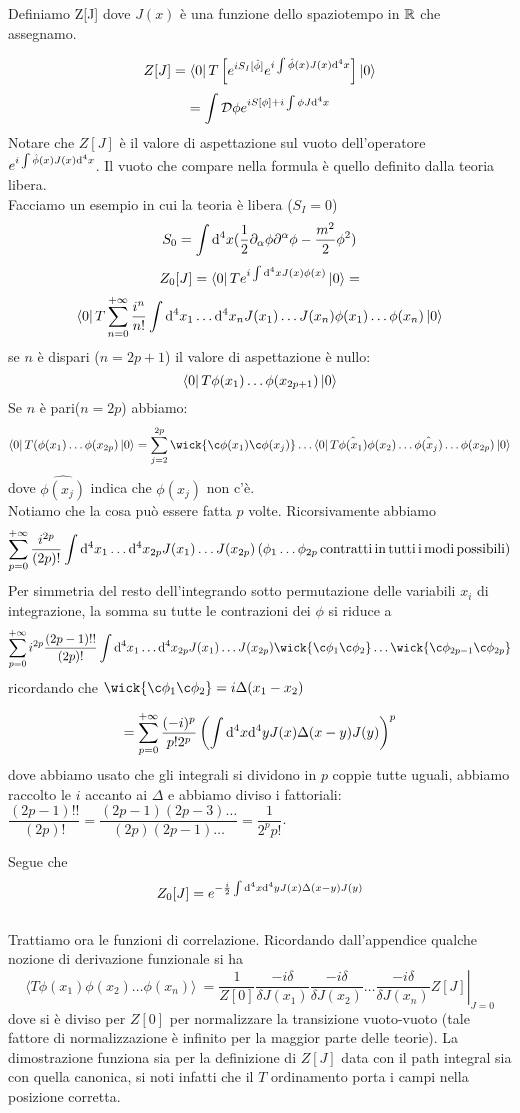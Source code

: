 \documentclass[a4paper, 11pt]{article}
\begin{document}
	
	Definiamo Z[J] dove $J(x)$ è una funzione dello spaziotempo in $\mathbb{R}$ che assegnamo.
	
	\[ Z[J] = \left\langle 0\right|T\left[e^{iS_I[\hat{\phi}]}e^{i\int{\hat{\phi}(x)J(x)}\mathrm{d}^4x}\right]\left| 0\right\rangle \]
	\[ = \int \mathcal{D}\phi e^{iS[\phi] + i \int \phi J \mathrm{d}^4 x} \]
	Notare che $Z[J]$ è il valore di aspettazione sul vuoto dell'operatore $e^{i\int{\hat{\phi}(x)J(x)}\mathrm{d}^4x}$. Il vuoto che compare nella formula è quello definito dalla teoria libera.
	\\
		
	Facciamo un esempio	in cui la teoria è libera ($S_I=0$)
	\[S_0 = \int \mathrm{d}^4 x (\frac{1}{2} \partial_\alpha \phi \partial^\alpha \phi - \frac{m^2}{2}\phi^2)\]
	\[Z_0[J]=\left\langle 0\right|Te^{i\int \mathrm{d}^4 x J(x)\phi(x)}\left| 0\right\rangle = \]
	\[\left\langle 0\right|T\sum_{n=0}^{+\infty} \frac{i^n}{n!}\int \mathrm{d}^4x_1 \dots \mathrm{d}^4 x_n J(x_1)\dots J(x_n) \phi(x_1)\dots \phi(x_n)\left| 0\right\rangle\]
	se $n$ è dispari ($n=2p+1$) il valore di aspettazione è nullo:
	\[\left\langle 0\right|T\phi(x_1)\dots \phi(x_{2p+1})\left| 0\right\rangle\]
	Se $n$ è pari($n=2p$) abbiamo:
	\[\bra{0}T(\phi(x_1)\dots\phi(x_{2p})\ket{0} = \sum_{j=2}^{2p}\wick{\c\phi(x_1) \c\phi(x_j)} \dots \bra{0}T\hat {\phi(x_1)} \phi(x_2) \dots \hat{\phi(x_j)}\dots \phi(x_{2p})\ket{0}\]
	dove $\hat {\phi(x_j)}$ indica che $\phi(x_j)$ non c'è.\\
	Notiamo che la cosa può essere fatta $p$ volte. Ricorsivamente abbiamo
	\[ \sum_{p=0}^{+\infty} \frac{i^{2p}}{(2p)!}\int \mathrm{d}^4x_1 \dots \mathrm{d}^4 x_{2p} J(x_1)\dots J(x_{2p}) \left(\phi_1\dots\phi_{2p}\, \mathrm{contratti\, in\, tutti\, i\, modi\, possibili}\right)\]
	Per simmetria del resto dell'integrando sotto permutazione delle variabili $x_i$ di integrazione, la somma su tutte le contrazioni dei $\phi$ si riduce a
	\[ \sum_{p=0}^{+\infty} i^{2p}\frac{(2p-1)!!}{(2p)!}\int \d^4x_1 \dots \d^4 x_{2p} J(x_1)\dots J(x_{2p}) \wick{\c \phi_1 \c \phi_2} \dots \wick{\c \phi_{2p-1} \c \phi_{2p}} \]
	ricordando che $\wick{\c \phi_1 \c \phi_2} = i \Delta(x_1-x_2)$
	
	\[= \sum_{p=0}^{+\infty} \frac{(-i)^p}{p!2^p} \left( \int \mathrm{d}^4 x \mathrm{d}^4 y J(x)\Delta(x-y)J(y)\right)^p\]
	dove abbiamo usato che gli integrali si dividono in $p$ coppie tutte uguali, abbiamo raccolto le $i$ accanto ai $\Delta$ e abbiamo diviso i fattoriali: $\dfrac{(2p-1)!!}{(2p)!} = \dfrac{(2p-1)(2p-3)\dots}{(2p)(2p-1)\dots} = \dfrac{1}{2^p p!}$.

	Segue che
	\[Z_0[J] = e^{-\frac{i}{2}\int \mathrm{d}^4 x \mathrm{d}^4 y J(x)\Delta(x-y)J(y)} \]
	\\
	
	Trattiamo ora le funzioni di correlazione. Ricordando dall'appendice qualche nozione di derivazione funzionale si ha
	\[ \langle T\phi(x_1)\phi(x_2)\dots \phi(x_n)\rangle\ = \left. \frac{1}{Z[0]}{\frac{-i\delta}{\delta J(x_1)}\frac{-i\delta}{\delta J(x_2)}\dots \frac{-i\delta}{\delta J(x_n)}}Z[J] \right|_{J=0} \]
	dove si è diviso per $Z[0]$ per normalizzare la transizione vuoto-vuoto (tale fattore di normalizzazione è infinito per la maggior parte delle teorie). La dimostrazione funziona sia per la definizione di $Z[J]$ data con il path integral sia con quella canonica, si noti infatti che il $T$ ordinamento porta i campi nella posizione corretta.
\end{document}

